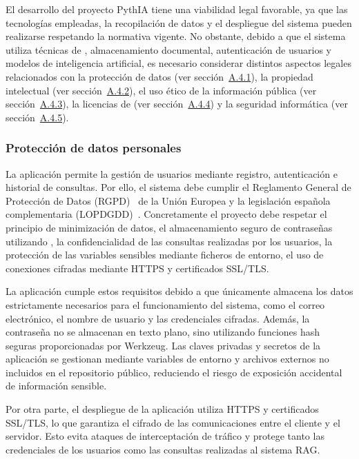 El desarrollo del proyecto PythIA tiene una viabilidad legal favorable, ya que las tecnologías empleadas, la recopilación de datos y el despliegue del sistema pueden realizarse respetando la normativa vigente. No obstante, debido a que el sistema utiliza técnicas de , almacenamiento documental, autenticación de usuarios y modelos de inteligencia artificial, es necesario considerar distintos aspectos legales relacionados con la protección de datos (ver sección~\hyperref[subsec:proctdatos]{A.4.1}), la propiedad intelectual (ver sección~\hyperref[subsec:propiedad]{A.4.2}), el uso ético de la información pública (ver sección~\hyperref[subsec:webScraping]{A.4.3}), la licencias de  (ver sección~\hyperref[subsec:IA]{A.4.4}) y la seguridad informática (ver sección~\hyperref[subsec:seg]{A.4.5}).

\subsubsection{Protección de datos personales}\label{subsec:proctdatos}

La aplicación permite la gestión de usuarios mediante registro, autenticación e historial de consultas. Por ello, el sistema debe cumplir el Reglamento General de Protección de Datos (RGPD)~\cite{legal:procdatos} de la Unión Europea y la legislación española complementaria (LOPDGDD)~\cite{legal:procdatoses}. Concretamente el proyecto debe respetar el principio de minimización de datos, el almacenamiento seguro de contraseñas utilizando , la confidencialidad de las consultas realizadas por los usuarios, la protección de las variables sensibles mediante ficheros de entorno, el uso de conexiones cifradas mediante HTTPS y certificados SSL/TLS.

La aplicación cumple estos requisitos debido a que únicamente almacena los datos estrictamente necesarios para el funcionamiento del sistema, como el correo electrónico, el nombre de usuario y las credenciales cifradas. Además, la contraseña no se almacenan en texto plano, sino utilizando funciones hash seguras proporcionadas por Werkzeug. Las claves privadas y secretos de la aplicación se gestionan mediante variables de entorno y archivos externos no incluidos en el repositorio público, reduciendo el riesgo de exposición accidental de información sensible.

Por otra parte, el despliegue de la aplicación utiliza HTTPS y certificados SSL/TLS, lo que garantiza el cifrado de las comunicaciones entre el cliente y el servidor. Esto evita ataques de interceptación de tráfico y protege tanto las credenciales de los usuarios como las consultas realizadas al sistema RAG.
 
